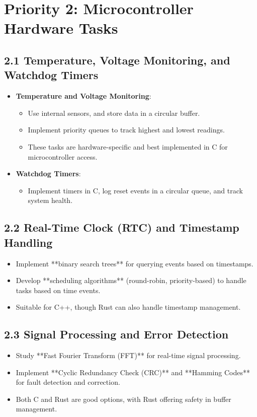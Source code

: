 \documentclass{article}
\begin{document}
\section*{Priority 2: Microcontroller Hardware Tasks}
\subsection*{2.1 Temperature, Voltage Monitoring, and Watchdog Timers}
\begin{itemize}
    \item \textbf{Temperature and Voltage Monitoring}:
    \begin{itemize}
        \item Use internal sensors, and store data in a circular buffer.
        \item Implement priority queues to track highest and lowest readings.
        \item These tasks are hardware-specific and best implemented in C for microcontroller access.
    \end{itemize}
    \item \textbf{Watchdog Timers}:
    \begin{itemize}
        \item Implement timers in C, log reset events in a circular queue, and track system health.
    \end{itemize}
\end{itemize}

\subsection*{2.2 Real-Time Clock (RTC) and Timestamp Handling}
\begin{itemize}
    \item Implement **binary search trees** for querying events based on timestamps.
    \item Develop **scheduling algorithms** (round-robin, priority-based) to handle tasks based on time events.
    \item Suitable for C++, though Rust can also handle timestamp management.
\end{itemize}

\subsection*{2.3 Signal Processing and Error Detection}
\begin{itemize}
    \item Study **Fast Fourier Transform (FFT)** for real-time signal processing.
    \item Implement **Cyclic Redundancy Check (CRC)** and **Hamming Codes** for fault detection and correction.
    \item Both C and Rust are good options, with Rust offering safety in buffer management.
\end{itemize}
\end{document}
